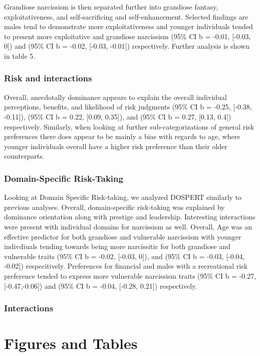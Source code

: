 \documentclass[
  donotrepeattitle,doc, 12pt, a4paper,floatsintext]{apa7}
\begin{document}
Grandiose narcissism is then separated further into grandiose fantasy, exploitativeness, and self-sacrificing and self-enhancement. Selected findings are males tend to demonstrate more exploitativeness and younger individuals tended to present more exploitative and grandiose narcissism (95\% CI b = -0.01, {[}-0.03, 0{]}) and (95\% CI b = -0.02, {[}-0.03, -0.01{]}) respectively. Further analysis is shown in table 5.
\hypertarget{risk-and-interactions}{%
\subsubsection{Risk and interactions}\label{risk-and-interactions}}
Overall, anecdotally dominance appears to explain the overall individual perceptions, benefits, and likelihood of risk judgments (95\% CI b = -0.25, {[}-0.38, -0.11{]}), (95\% CI b = 0.22, {[}0.09, 0.35{]}), and (95\% CI b = 0.27, {[}0.13, 0.4{]}) respectively. Similarly, when looking at further sub-categorizations of general risk preferences there does appear to be mainly a bias with regards to age, where younger individuals overall have a higher risk preference than their older counterparts.
\hypertarget{domain-specific-risk-taking-1}{%
\subsubsection{Domain-Specific Risk-Taking}\label{domain-specific-risk-taking-1}}
Looking at Domain Specific Risk-taking, we analyzed DOSPERT similarly to previous analyses. Overall, domain-specific risk-taking was explained by dominance orientation along with prestige and leadership. Interesting interactions were present with individual domains for narcissism as well.
Overall, Age was an effective predictor for both grandiose and vulnerable narcissism with younger indivdiuals tending towards being more narcissitic for both grandiose and vulnerable traits (95\% CI b = -0.02, {[}-0.03, 0{]}), and (95\% CI b = -0.03, {[}-0.04, -0.02{]}) respecitively. Preferences for financial and males with a recreational risk preference tended to express more vulnerable narcissism traits (95\% CI b = -0.27, {[}-0.47,-0.06{]}) and (95\% CI b = -0.04, {[}-0.28, 0.21{]}) respectively.
\hypertarget{interactions-1}{%
\subsubsection{Interactions}\label{interactions-1}}
\newpage
\hypertarget{figures-and-tables}{%
\section{Figures and Tables}\label{figures-and-tables}}
\end{document}
